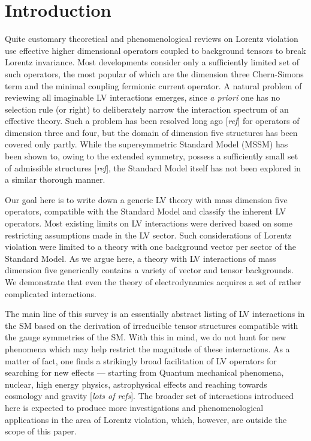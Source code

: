 \documentclass[12pt]{revtex4}
\begin{document}
\section{Introduction}

	Quite customary theoretical and phenomenological reviews on
	Lorentz violation use effective higher dimensional operators coupled 
	to background tensors to break Lorentz invariance.
	Most developments consider only a sufficiently limited set
	of such operators, the most popular of which are the dimension three
	Chern-Simons term and the minimal coupling fermionic current operator. 
	A natural problem of reviewing all imaginable LV interactions
	emerges, since {\it a priori} one has no selection rule (or right) to 
	deliberately narrow the interaction spectrum of an effective theory.
	Such a problem has been resolved long ago [{\it ref}] for operators of 
	dimension three and four, but the domain of dimension five structures has
	been covered only partly. 
	While the supersymmetric Standard Model (MSSM) has been shown to,
	owing to the extended symmetry, possess a sufficiently small set of 
	admissible structures [{\it ref}], the Standard Model itself has not 
	been explored in a similar thorough manner.

	Our goal here is to write down a generic LV theory with mass dimension
	five operators, compatible with the Standard Model and classify
	the inherent LV operators. 
	Most existing limits on LV interactions were derived based on some
	restricting assumptions made in the LV sector.
	Such considerations of Lorentz violation were limited to a theory with
	one background vector per sector of the Standard Model.
	As we argue here, a theory with LV interactions of mass
	dimension five generically contains a variety of vector and tensor 
	backgrounds.
	We demonstrate that even the theory of electrodynamics acquires a set
	of rather complicated interactions. 

	The main line of this survey is an essentially abstract listing 
	of LV interactions in the SM based on the derivation of irreducible
	tensor structures compatible with the gauge symmetries of the SM.
	With this in mind, we do not hunt for new phenomena which may help
	restrict the magnitude of these interactions. 
	As a matter of fact, one finds a strikingly broad facilitation of 
	LV operators for searching for new effects ---
	starting from Quantum mechanical phenomena, nuclear, high energy physics,
	astrophysical effects and reaching towards cosmology and gravity
	[{\it lots of refs}].
	The broader set of interactions introduced here is expected to 
	produce more investigations and phenomenological applications in the area of
	Lorentz violation, which, however, are outside the scope of this paper. 
\end{document}
